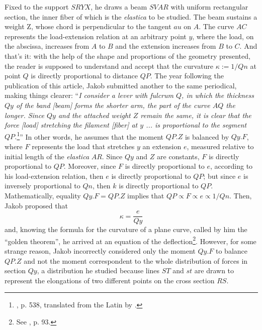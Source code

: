 Fixed to the support $SRYX$, he draws a beam $SVAR$ with uniform rectangular section, the inner fiber of which is the \emph{elastica} to be studied. The beam sustains a weight Z, whose chord is perpendicular to the tangent $au$ on $A$. The curve $AC$ represents the load-extension relation at an arbitrary point $y$, where the load, on the abscissa, increases from $A$ to $B$ and the extension increases from $B$ to $C$. And that's it: with the help of the shape and proportions of the geometry presented, the reader is supposed to understand and accept that the curvature $\kappa:=1/Qn$ at point $Q$ is directly proportional to distance $QP$. The year following the publication of this article, Jakob submitted another to the same periodical, making things clearer: ``\emph{I consider a lever with fulcrum $Q$, in which the thickness $Qy$ of the band [beam] forms the shorter arm, the part of the curve $AQ$ the longer. Since $Qy$ and the attached weight $Z$ remain the same, it is clear that the force [load] stretching the filament [fiber] at $y$ ... is proportional to the segment $QP$.}\footnote{\cite{jakob_1695}, p. 538, translated from the Latin by \cite{truesdell_1960}.}'' In other words, he assumes that the moment $QP.Z$ is balanced by $Qy.F$, where $F$ represents the load that stretches $y$ an extension $e$, measured relative to initial length of the \emph{elastica} $AR$. Since $Qy$ and $Z$ are constants, $F$ is directly proportional to $QP$. Moreover, since $F$ is directly proportional to $e$, according to his load-extension relation, then $e$ is directly proportional to $QP$; but since $e$ is inversely proportional to $Qn$, then $k$ is directly proportional to $QP$. Mathematically, equality $Qy.F=QP.Z$ implies that $QP \propto F \propto e \propto 1/Qn$. Then, Jakob proposed that 
\begin{equation*}
\kappa=\dfrac{e}{Qy}
\end{equation*}
and, knowing the formula for the curvature of a plane curve, called by him the ``golden theorem'', he arrived at an equation of the deflection\footnote{See \cite{truesdell_1960}, p. 93.}. However, for some strange reason, Jakob incorrectly considered only the moment $Qy.F$ to balance $QP.Z$ and not the moment correspondent to the whole distribution of forces in section $Qy$, a distribution he studied because lines $ST$ and $st$ are drawn to represent the elongations of two different points on the cross section $RS$. 


